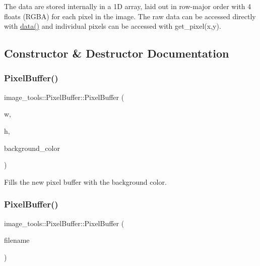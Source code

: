 The data are stored internally in a 1D array, laid out in row-\/major order with 4 floats (R\+G\+BA) for each pixel in the image. The raw data can be accessed directly with \hyperlink{classimage__tools_1_1PixelBuffer_a8f7b9f293b7ac93f8c33f75f50ce5a7b}{data()} and individual pixels can be accessed with get\+\_\+pixel(x,y). 

\subsection{Constructor \& Destructor Documentation}
\mbox{\label{classimage__tools_1_1PixelBuffer_a4f5b5df93389946d70bc001acfebcedb}} 
\subsubsection{\texorpdfstring{Pixel\+Buffer()}{PixelBuffer()}\hspace{0.1cm}{\footnotesize\ttfamily [1/3]}}
{\footnotesize\ttfamily image\+\_\+tools\+::\+Pixel\+Buffer\+::\+Pixel\+Buffer (\begin{DoxyParamCaption}\item[{int}]{w,  }\item[{int}]{h,  }\item[{\hyperlink{classimage__tools_1_1ColorData}{Color\+Data}}]{background\+\_\+color }\end{DoxyParamCaption})}

Fills the new pixel buffer with the background color. \mbox{\label{classimage__tools_1_1PixelBuffer_a22e3446de759c42e6be6f290feca8461}} 
\subsubsection{\texorpdfstring{Pixel\+Buffer()}{PixelBuffer()}\hspace{0.1cm}{\footnotesize\ttfamily [2/3]}}
{\footnotesize\ttfamily image\+\_\+tools\+::\+Pixel\+Buffer\+::\+Pixel\+Buffer (\begin{DoxyParamCaption}\item[{const std\+::string \&}]{filename }\end{DoxyParamCaption})\hspace{0.3cm}{\ttfamily [explicit]}}

